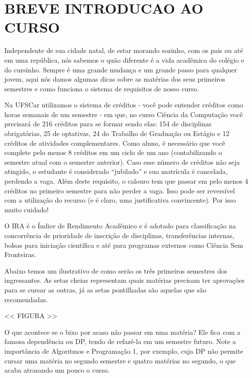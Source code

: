 \section{BREVE INTRODUCAO AO CURSO}
Independente de sua cidade natal, de estar morando sozinho, com os pais ou até em uma república, nós sabemos o quão diferente é a vida acadêmica do colégio e do cursinho. Sempre é uma grande mudança e um grande passo para qualquer jovem, aqui nós damos algumas dicas sobre as matérias dos seus primeiros semestres e como funciona o sistema de requisitos de nosso curso.

Na UFSCar utilizamos o sistema de créditos - você pode entender créditos como horas semanais de um semestre - em que, no curso Ciência da Computação você precisará de 216 créditos para se formar sendo elas: 154 de disciplinas obrigatórias, 25 de optativas, 24 do Trabalho de Graduação ou Estágio e 12 créditos de atividades complementares. Como aluno, é necessário que você complete pelo menos 8 créditos em um ciclo de um ano (contabilizando o semestre atual com o semestre anterior). Caso esse número de créditos não seja atingido, o estudante é considerado “jubilado” e sua matrícula é cancelada, perdendo a vaga. Além deste requisito, o calouro tem que passar em pelo menos 4 créditos no primeiro semestre para não perder a vaga. Isso pode ser reversível com a utilização do recurso (e é claro, uma justificativa convincente). Por isso muito cuidado!

O IRA é o Índice de Rendimento Acadêmico e é adotado para classificação na concorrência de prioridade de inscrição de disciplinas, transferências internas, bolsas para iniciação científica e até para programas externos como Ciência Sem Fronteiras. 

Abaixo temos um ilustrativo de como serão os três primeiros semestres dos ingressantes. As setas cheias representam quais matérias precisam ter aprovações para se cursar as outras, já as setas pontilhadas são aquelas que são recomendadas.

<< FIGURA >>

O que acontece se o bixo por acaso não passar em uma matéria? Ele fica com a famosa dependência ou DP, tendo de refazê-la em um semestre futuro. Note a importância de Algoritmos e Programação 1, por exemplo, cuja DP não permite cursar uma matéria no segundo semestre e quatro matérias no segundo, o que acaba atrasando um pouco o curso.
